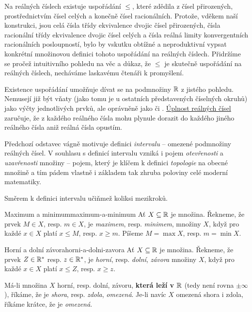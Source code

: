 Na reálných číslech existuje uspořádání $ \leq $, které zdědila z čísel
přirozených, prostřednictvím čísel celých a konečně čísel racionálních. Protože,
vděkem naší konstrukci, jsou celá čísla třídy ekvivalence dvojic čísel
přirozených, čísla racionální třídy ekvivalence dvojic čísel celých a čísla
reálná limity konvergentních racionálních posloupností, bylo by vskutku obtížné
a neproduktivní vypsat konkrétní množinovou definici tohoto uspořádání na
reálných číslech. Přidržíme se pročež intuitivního pohledu na věc a důkaz, že
$ \leq $ je skutečně uspořádání na reálných číslech, necháváme laskavému čtenáři
k promyšlení.

Existence uspořádání umožňuje dívat se na podmnožiny $\mathbb{R}$ z jistého
 pohledu. Nemusejí již být vňaty (jako tomu je u ostatních
představených číselných okruhů) jako výčty jednotlivých prvků, ale oprávněně
jako  či . \hyperref[cor:r-jsou-uplna]{Úplnost reálných
čísel} zaručuje, že z každého reálného čísla mohu plynule dorazit do každého
jiného reálného čísla aniž reálná čísla opustím.

Předchozí odstavec vágně motivuje definici \emph{intervalu} -- 
omezené podmnožiny reálných čísel. V souhlasu s definicí intervalu vzniká i
pojem \emph{otevřenosti} a \emph{uzavřenosti} množiny -- pojem, který je klíčem
k definici \emph{topologie} na obecné množině a tím pádem vlastně i základem tak
zhruba poloviny celé moderní matematiky.

Směrem k definici intervalu učiňmež koliksi mezikroků.

\begin{definition}{Maximum a minimum}{maximum-a-minimum}
 Ať $X \subseteq \mathbb{R}$ je množina. Řekneme, že prvek $M \in X$, resp. $m \in X$,
 je \emph{maximem}, resp. \emph{minimem}, množiny $X$, když pro každé $x \in X$
 platí $x \leq M$, resp. $x \geq m$. Píšeme $M = \max X$, resp. $m = \min X$.
\end{definition}

\begin{definition}{Horní a dolní závora}{horni-a-dolni-zavora}
 Ať $X \subseteq \mathbb{R}$ je množina. Řekneme, že prvek $Z \in \mathbb{R}^{*}$ resp. $z \in
 \mathbb{R}^{*}$, je \emph{horní}, resp. \emph{dolní}, \emph{závora} množiny $X$, když
 pro každé $x \in X$ platí $x \leq Z$, resp. $x \geq z$.

 Má-li množina $X$ horní, resp. dolní, závoru, \textbf{která leží v $\mathbb{R}$} (tedy
 není rovna $ \pm \infty$), říkáme, že je \emph{shora}, resp. \emph{zdola},
 \emph{omezená}. Je-li navíc $X$ omezená shora i zdola, říkáme krátce, že je
 \emph{omezená}.
\end{definition}

